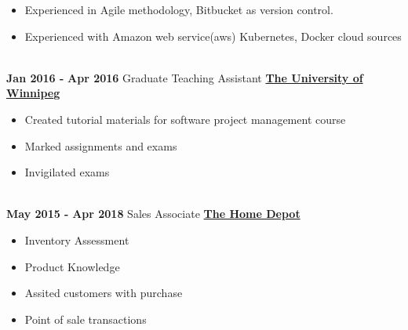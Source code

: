 \documentclass[letterpaper]{twentysecondcv} %
\begin{document}
\begin{twenty}
{\begin{itemize}
        \textbf{Software development and DevOps Experiences:}
        \item Experienced in Agile methodology, Bitbucket as version control.
        \item Experienced with Amazon web service(aws) Kubernetes, Docker cloud sources
        \vspace{-0.2cm}
   	    \end{itemize}}
        \\
        \vspace{-0.2cm}
    \twentyitem
   		{\bf Jan 2016 -}
		{\bf Apr 2016}
        {\large Graduate Teaching Assistant }
        {\href{https://www.uwinnipeg.ca/}{\bf \large The University of Winnipeg}}
        {}
        {
        {\begin{itemize}
        \item Created tutorial materials for software project management course
        \item Marked assignments and exams
        \item Invigilated exams
        \vspace{-0.4cm}
    \end{itemize}}
        }
     \\
     \twentyitem
   		{\bf May 2015 -}
		{\bf Apr 2018}
        {\large Sales Associate}
        {\href{https://www.homedepot.ca/en/home.html}{\bf \large The Home Depot}}
        {}
        {
        \begin{itemize}
        	\vspace{-0.2cm}
        \item Inventory Assessment
        \item Product Knowledge 
        \item Assited customers with purchase 
        \item Point of sale transactions
    \end{itemize}
    	}
        
\end{twenty}
 \vspace{-0.2cm}
\vspace{-0.2cm}
\end{document}
